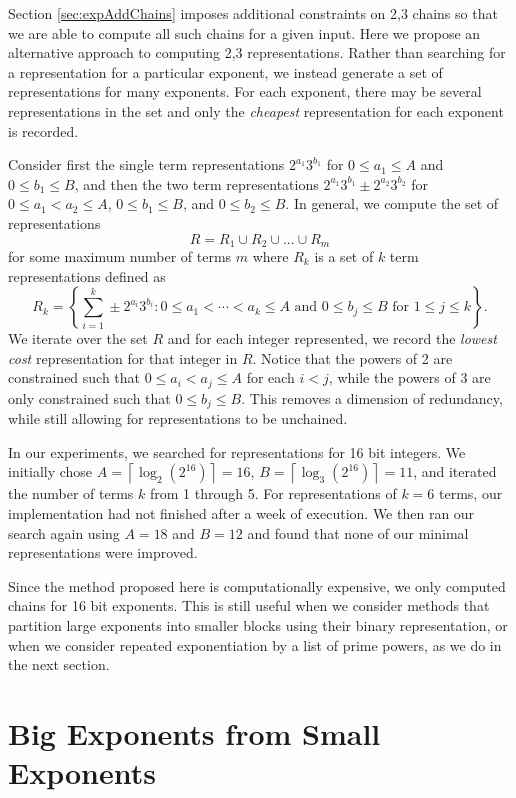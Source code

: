 \documentclass{ucalgthes1}
\theoremstyle{definition}
\newcommand{\ceil}[1]{\left\lceil #1 \right\rceil}
\begin{document}
Section \ref{sec:expAddChains} imposes additional constraints on 2,3 chains so that we are able to compute all such chains for a given input.  Here we propose an alternative approach to computing 2,3 representations.  Rather than searching for a representation for a particular exponent, we instead generate a set of representations for many exponents.  For each exponent, there may be several representations in the set and only the \emph{cheapest} representation for each exponent is recorded.

Consider first the single term representations $2^{a_1}3^{b_1}$ for $0 \le a_1 \le A$ and $0 \le b_1 \le B$, and then the two term representations $2^{a_1}3^{b_1} \pm 2^{a_2}3^{b_2}$ for $0 \le a_1 < a_2 \le A$, $0 \le b_1 \le B$, and $0 \le b_2 \le B$.   In general, we compute the set of representations
\[
R = R_1 \cup R_2 \cup ... \cup R_m
\]
for some maximum number of terms $m$ where $R_k$ is a set of $k$ term representations defined as
\[
R_k = \left\{\sum_{i=1}^k\pm 2^{a_i}3^{b_i} : 0 \le a_1 < \cdots < a_k \le A \textrm{ and } 0 \le b_j \le B \textrm{ for } 1 \le j \le k \right\}.
\]
We iterate over the set $R$ and for each integer represented, we record the \emph{lowest cost} representation for that integer in $R$.  Notice that the powers of 2 are constrained such that $0 \le a_i < a_j \le A$ for each $i < j$, while the powers of 3 are only constrained such that $0 \le b_j \le B$.  This removes a dimension of redundancy, while still allowing for representations to be unchained.

In our experiments, we searched for representations for 16 bit integers. We initially chose $A = \ceil{\log_2\left(2^{16}\right)} = 16$, $B = \ceil{\log_3 \left(2^{16}\right)} = 11$, and iterated the number of terms $k$ from 1 through 5.  For representations of $k = 6$ terms, our implementation had not finished after a week of execution.  We then ran our search again using $A=18$ and $B=12$ and found that none of our minimal representations were improved.

Since the method proposed here is computationally expensive, we only computed chains for 16 bit exponents.  This is still useful when we consider methods that partition large exponents into smaller blocks using their binary representation, or when we consider repeated exponentiation by a list of prime powers, as we do in the next section.


\section{Big Exponents from Small Exponents}
\label{sec:expBigFromSmall}
\end{document}
